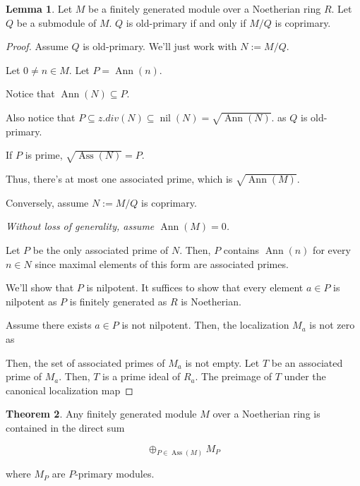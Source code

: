 \documentclass{article}
\theoremstyle{definition}
\newtheorem{theorem}{Theorem}[section]
\newtheorem{lemma}[theorem]{Lemma}
\newcommand{\nil}{\operatorname{nil}}
\newcommand{\ann}{\operatorname{Ann}}
\newcommand{\ass}{\operatorname{Ass}}
\begin{document}
\begin{lemma}
    Let $ M $ be a finitely generated module over a Noetherian ring $ R $.
    Let $ Q $ be a submodule of $ M $.
    $ Q $ is old-primary if and only if $ M/Q $ is coprimary.
\end{lemma}
\begin{proof}

    Assume $ Q $ is old-primary.
    We'll just work with $ N := M/Q $.

    Let $ 0 \neq n \in M $. Let $ P = \ann(n) $.

    Notice that $ \ann(N) \subseteq P $.

    Also notice that $ P \subseteq z.div(N) \subseteq \nil(N) = \sqrt{\ann(N)} $.
    as $ Q $ is old-primary.

    If $ P $ is prime, $ \sqrt{\ass(N)} = P $.

    Thus, there's at most one associated prime, which is $ \sqrt{\ann(M)} $.

    Conversely, assume $ N := M/Q $ is coprimary.

    \textit{Without loss of generality, assume $ \ann(M) = 0 $.}

    Let $ P $ be the only associated prime of $ N $.
    Then, $ P $ contains $ \ann(n) $ for every $ n \in N $ since
    maximal elements of this form are associated primes.

    We'll show that $ P $ is nilpotent. It suffices
    to show that every element $ a \in P $ is nilpotent
    as $ P $ is finitely generated as $ R $ is Noetherian.

    Assume there exists $ a \in P $ is not nilpotent.
    Then, the localization $ M_{a} $ is not zero 
    as %

    Then, the set of associated primes of $ M_{a} $
    is not empty. Let $ T $ be an associated prime
    of $ M_{a} $. Then, $ T $ is a prime ideal of $ R_{a} $.
    The preimage of $ T $ under the canonical localization map

\end{proof}



\begin{theorem}
    Any finitely generated module $ M $ over a Noetherian ring
    is contained in the direct sum 

    \[ \oplus_{P \in \ass(M)} M_{P} \]

    where $ M_{P} $ are $ P $-primary modules.
\end{theorem}
\end{document}
